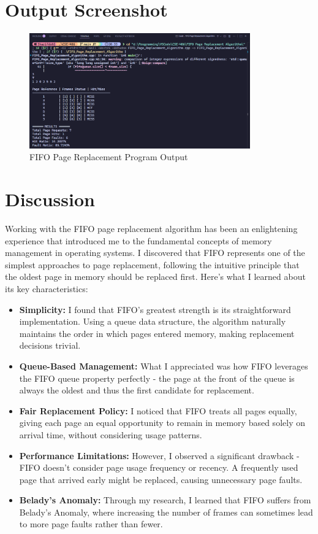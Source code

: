 \documentclass[12pt,a4paper]{article}
\begin{document}
\section{Output Screenshot}
\begin{figure}[H]
  \centering
  \includegraphics[width=0.85\textwidth]{Screenshot 2025-10-03 203502.png}
  \caption{FIFO Page Replacement Program Output}
\end{figure}

\section{Discussion}
Working with the FIFO page replacement algorithm has been an enlightening experience that introduced me to the fundamental concepts of memory management in operating systems. I discovered that FIFO represents one of the simplest approaches to page replacement, following the intuitive principle that the oldest page in memory should be replaced first. Here's what I learned about its key characteristics:

\begin{itemize}
    \item \textbf{Simplicity:} I found that FIFO's greatest strength is its straightforward implementation. Using a queue data structure, the algorithm naturally maintains the order in which pages entered memory, making replacement decisions trivial.
    \item \textbf{Queue-Based Management:} What I appreciated was how FIFO leverages the FIFO queue property perfectly - the page at the front of the queue is always the oldest and thus the first candidate for replacement.
    \item \textbf{Fair Replacement Policy:} I noticed that FIFO treats all pages equally, giving each page an equal opportunity to remain in memory based solely on arrival time, without considering usage patterns.
    \item \textbf{Performance Limitations:} However, I observed a significant drawback - FIFO doesn't consider page usage frequency or recency. A frequently used page that arrived early might be replaced, causing unnecessary page faults.
    \item \textbf{Belady's Anomaly:} Through my research, I learned that FIFO suffers from Belady's Anomaly, where increasing the number of frames can sometimes lead to more page faults rather than fewer.
\end{itemize}
\end{document}
